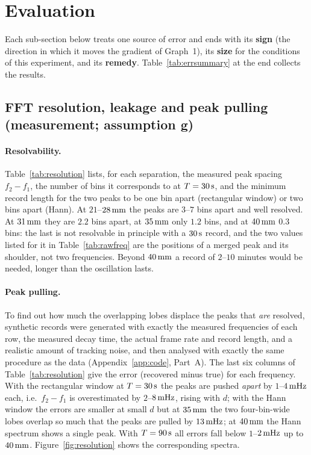 \section{Evaluation}\label{sec:evaluation}

Each sub-section below treats one source of error and ends with its \textbf{sign} (the direction in which it moves the gradient of Graph~1), its \textbf{size} for the conditions of this experiment, and its \textbf{remedy}. Table~\ref{tab:errsummary} at the end collects the results.

\subsection{FFT resolution, leakage and peak pulling (measurement; assumption g)}\label{sec:fftres}

\paragraph{Resolvability.} Table~\ref{tab:resolution} lists, for each separation, the measured peak spacing $f_2-f_1$, the number of bins it corresponds to at $T=30\,\mathrm{s}$, and the minimum record length for the two peaks to be one bin apart (rectangular window) or two bins apart (Hann). At $21$--$28\,\mathrm{mm}$ the peaks are $3$--$7$ bins apart and well resolved. At $31\,\mathrm{mm}$ they are $2.2$ bins apart, at $35\,\mathrm{mm}$ only $1.2$ bins, and at $40\,\mathrm{mm}$ $0.3$ bins: the last is not resolvable in principle with a $30\,\mathrm{s}$ record, and the two values listed for it in Table~\ref{tab:rawfreq} are the positions of a merged peak and its shoulder, not two frequencies. Beyond $40\,\mathrm{mm}$ a record of $2$--$10$ minutes would be needed, longer than the oscillation lasts.

\paragraph{Peak pulling.} To find out how much the overlapping lobes displace the peaks that \emph{are} resolved, synthetic records were generated with exactly the measured frequencies of each row, the measured decay time, the actual frame rate and record length, and a realistic amount of tracking noise, and then analysed with exactly the same procedure as the data (Appendix~\ref{app:code}, Part~A). The last six columns of Table~\ref{tab:resolution} give the error (recovered minus true) for each frequency. With the rectangular window at $T=30\,\mathrm{s}$ the peaks are pushed \emph{apart} by $1$--$4\,\mathrm{mHz}$ each, i.e.\ $f_2-f_1$ is overestimated by $2$--$8\,\mathrm{mHz}$, rising with $d$; with the Hann window the errors are smaller at small $d$ but at $35\,\mathrm{mm}$ the two four-bin-wide lobes overlap so much that the peaks are pulled by $13\,\mathrm{mHz}$; at $40\,\mathrm{mm}$ the Hann spectrum shows a single peak. With $T=90\,\mathrm{s}$ all errors fall below $1$--$2\,\mathrm{mHz}$ up to $40\,\mathrm{mm}$. Figure~\ref{fig:resolution} shows the corresponding spectra.

